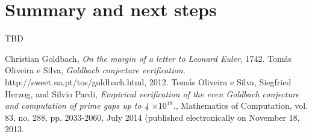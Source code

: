 \documentclass[10pt,twocolumn]{article}
\begin{document}
\section{Summary and next steps}

TBD

\begin{thebibliography}{9}
  Christian Goldbach, 
  \emph{On the margin of a letter to Leonard Euler},
  1742.
  Tomás Oliveira e Silva,
  \emph{Goldbach conjecture verification.}
  http://sweet.ua.pt/tos/goldbach.html,
  2012.
  Tomás Oliveira e Silva, Siegfried Herzog, and Silvio Pardi, 
  \emph{Empirical verification of the even Goldbach conjecture and computation of prime gaps up to 4 $\times 10^{18}$.}, 
  Mathematics of Computation, vol. 83, no. 288, pp. 2033-2060, 
  July 2014 (published electronically on November 18, 2013.
  
\end{thebibliography}
\end{document}
